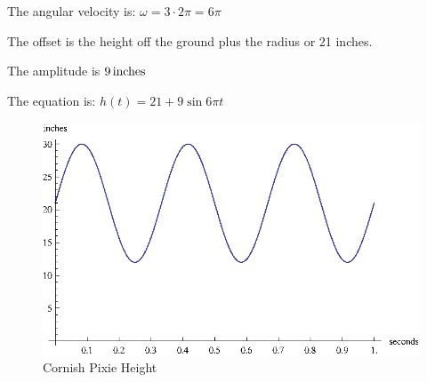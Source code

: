 \documentclass[fleqn,addpoints]{exam}
\begin{document}
\begin{questions}
          \begin{solution}
            \begin{itemize*}
              \item The angular velocity is: $\omega = 3 \cdot 2 \pi = 6 \pi$
              \item The offset is the height off the ground plus the radius or 21 inches.
              \item The amplitude is $\unit[9]{inches}$
            \end{itemize*}

            The equation is: $h(t) = 21 + 9 \sin 6 \pi t$ 

            \begin{figure}[H]
              \centering
              \includegraphics[scale=1.0]{graph5.eps}
              \caption{Cornish Pixie Height}
            \end{figure}

          \end{solution}

  \end{questions}
\end{document}

